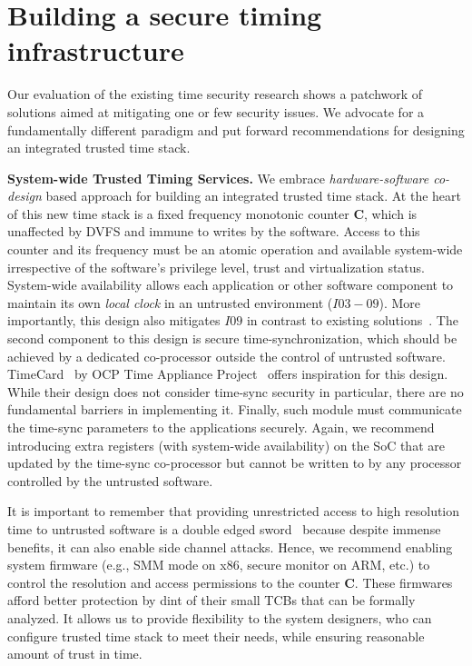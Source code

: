 \section{Building a secure timing infrastructure}
Our evaluation of the existing time security research shows a patchwork of solutions aimed at mitigating one or few security issues. We advocate for a fundamentally different paradigm and put forward recommendations for designing an integrated trusted time stack.

\noindent\textbf{System-wide Trusted Timing Services.} We embrace \emph{hardware-software co-design} based approach for building an integrated trusted time stack. At the heart of this new time stack is a fixed frequency monotonic counter $\mathbf{C}$, which is unaffected by DVFS and immune to writes by the software. Access to this counter and its frequency must be an atomic operation and available system-wide irrespective of the software's privilege level, trust and virtualization status. System-wide availability allows each application or other software component to maintain its own \textit{local clock} in an untrusted environment ($I03-09$). More importantly, this design also mitigates $I09$ in contrast to existing solutions~\cite{time-stack-timeseal, trusted-time-t3e}. The second component to this design is secure time-synchronization, which should be achieved by a dedicated co-processor outside the control of untrusted software. TimeCard~\cite{time-card} by OCP Time Appliance Project~\cite{ocp-tap} offers inspiration for this design. While their design does not consider time-sync security in particular, there are no fundamental barriers in implementing it. Finally, such module must communicate the time-sync parameters to the applications securely. Again, we recommend introducing extra registers (with system-wide availability) on the SoC that are updated by the time-sync co-processor but cannot be written to by any processor controlled by the untrusted software. 

It is important to remember that providing unrestricted access to high resolution time to untrusted software is a double edged sword~\cite{browser-timing-side-channel} because despite immense benefits, it can also enable side channel attacks. Hence, we recommend enabling system firmware (e.g., SMM mode on x86, secure monitor on ARM, etc.) to control the resolution and access permissions to the counter $\mathbf{C}$. These firmwares afford better protection by dint of their small TCBs that can be formally analyzed. It allows us to provide flexibility to the system designers, who can configure trusted time stack to meet their needs, while ensuring reasonable amount of trust in time.

